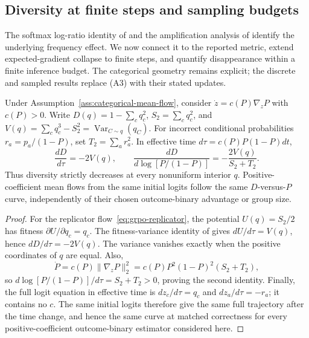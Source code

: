 \subsection{Diversity at finite steps and sampling budgets}
\label{app:finite-time-diversity}

The softmax log-ratio identity of
\citet[Theorem~3.1 and App.~A.1]{sinha2026expected} and the amplification
analysis of \citet[Section~4.2]{lochab2026ucpo} identify the underlying
frequency effect. We now connect it to the reported \pmd{} metric, extend
expected-gradient collapse to finite steps, and quantify disappearance within
a finite inference budget. The categorical geometry remains explicit;
the discrete and sampled results replace (A3) with their stated updates.

\begin{proposition}
\enforcehalffinalproseline
\label{prop:pcmd-drift}
Under Assumption~\ref{ass:categorical-mean-flow}, consider
$\dot z=c(P)\nabla_zP$ with $c(P)>0$. Write
$D(q)=1-\sum_cq_c^2$, $S_2=\sum_cq_c^2$, and
$V(q)=\sum_cq_c^3-S_2^2=\operatorname{Var}_{C\sim q}(q_C)$.
For incorrect conditional probabilities $r_a=p_a/(1-P)$, set
$T_2=\sum_ar_a^2$. In effective time $d\tau=c(P)P(1-P)dt$,
\begin{equation}
 \frac{dD}{d\tau}=-2V(q),
 \qquad
 \frac{dD}{d\log[P/(1-P)]}
 =-\frac{2V(q)}{S_2+T_2}.
 \label{eq:pcmd-drift}
\end{equation}
Thus diversity strictly decreases at every nonuniform interior $q$.
Positive-coefficient mean flows from the same initial logits follow the same
$D$-versus-$P$ curve, independently of their chosen outcome-binary advantage or
group size.
\end{proposition}

\begin{proof}
\enforcehalffinalproseline
For the replicator flow~\eqref{eq:grpo-replicator}, the potential
$U(q)=S_2/2$ has fitness $\partial U/\partial q_c=q_c$.
The fitness-variance identity of
\citet[Theorems~1--2]{harper2009informationgeometry} gives
$dU/d\tau=V(q)$, hence $dD/d\tau=-2V(q)$.
The variance vanishes exactly when the
positive coordinates of $q$ are equal. Also,
\[
 \dot P=c(P)\|\nabla_zP\|_2^2
       =c(P)P^2(1-P)^2(S_2+T_2),
\]
so $d\log[P/(1-P)]/d\tau=S_2+T_2>0$, proving the second identity.
Finally, the full logit equation in effective time is
$dz_c/d\tau=q_c$ and $dz_a/d\tau=-r_a$; it contains no $c$.
The same initial logits therefore give the same full trajectory after the
time change, and hence the same curve at matched correctness for every positive-coefficient outcome-binary estimator considered here.
\end{proof}

